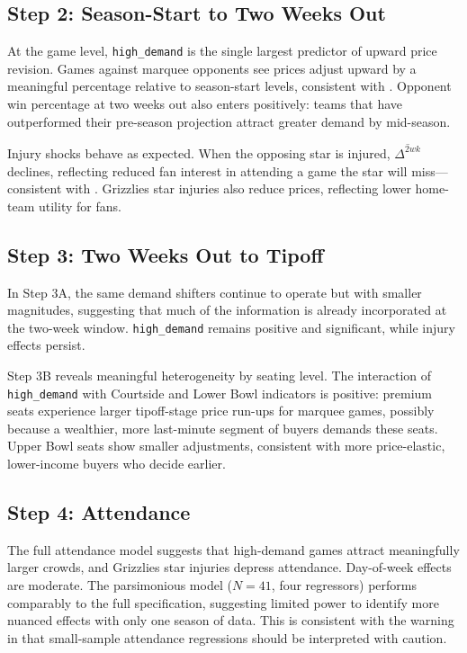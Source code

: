 \documentclass[12pt]{article}
\begin{document}
 
\subsection{Step 2: Season-Start to Two Weeks Out}
 
At the game level, \texttt{high\_demand} is the single largest predictor of upward price revision. Games against marquee opponents see prices adjust upward by a meaningful percentage relative to season-start levels, consistent with \citet{drayer2012dynamic}. Opponent win percentage at two weeks out also enters positively: teams that have outperformed their pre-season projection attract greater demand by mid-season.
 
Injury shocks behave as expected. When the opposing star is injured, $\overline{\Delta^{2wk}}$ declines, reflecting reduced fan interest in attending a game the star will miss---consistent with \citet{kaplan2019economic}. Grizzlies star injuries also reduce prices, reflecting lower home-team utility for fans.
 
\subsection{Step 3: Two Weeks Out to Tipoff}
 
In Step 3A, the same demand shifters continue to operate but with smaller magnitudes, suggesting that much of the information is already incorporated at the two-week window. \texttt{high\_demand} remains positive and significant, while injury effects persist.
 
Step 3B reveals meaningful heterogeneity by seating level. The interaction of \texttt{high\_demand} with Courtside and Lower Bowl indicators is positive: premium seats experience larger tipoff-stage price run-ups for marquee games, possibly because a wealthier, more last-minute segment of buyers demands these seats. Upper Bowl seats show smaller adjustments, consistent with more price-elastic, lower-income buyers who decide earlier.
 
\subsection{Step 4: Attendance}
 
The full attendance model suggests that high-demand games attract meaningfully larger crowds, and Grizzlies star injuries depress attendance. Day-of-week effects are moderate. The parsimonious model ($N = 41$, four regressors) performs comparably to the full specification, suggesting limited power to identify more nuanced effects with only one season of data. This is consistent with the warning in \citet{drayer2012dynamic} that small-sample attendance regressions should be interpreted with caution.
 
\end{document}

